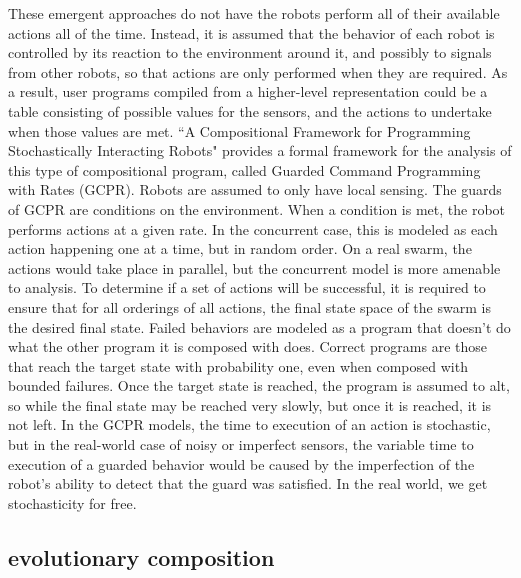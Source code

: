 \documentclass[]{article}
\begin{document}
These emergent approaches do not have the robots perform all of their available actions all of the time. 
Instead, it is assumed that the behavior of each robot is controlled by its reaction to the environment around it, and possibly to signals from other robots, so that actions are only performed when they are required. 
As a result, user programs compiled from a higher-level representation could be a table consisting of possible values for the sensors, and the actions to undertake when those values are met.
``A Compositional Framework for Programming Stochastically Interacting Robots" \cite{napp2011compositional} provides a formal framework for the analysis of this type of compositional program, called Guarded Command Programming with Rates (GCPR). 
Robots are assumed to only have local sensing.
The guards of GCPR are conditions on the environment.
When a condition is met, the robot performs actions at a given rate. 
In the concurrent case, this is modeled as each action happening one at a time, but in random order. 
On a real swarm, the actions would take place in parallel, but the concurrent model is more amenable to analysis. 
To determine if a set of actions will be successful, it is required to ensure that for all orderings of all actions, the final state space of the swarm is the desired final state. 
Failed behaviors are modeled as a program that doesn't do what the other program it is composed with does. 
Correct programs are those that reach the target state with probability one, even when composed with bounded failures. 
Once the target state is reached, the program is assumed to alt, so while the final state may be reached very slowly, but once it is reached, it is not left. 
In the GCPR models, the time to execution of an action is stochastic, but in the real-world case of noisy or imperfect sensors, the variable time to execution of a guarded behavior would be caused by the imperfection of the robot's ability to detect that the guard was satisfied. 
In the real world, we get stochasticity for free. 


\subsection{evolutionary composition}
\end{document}
